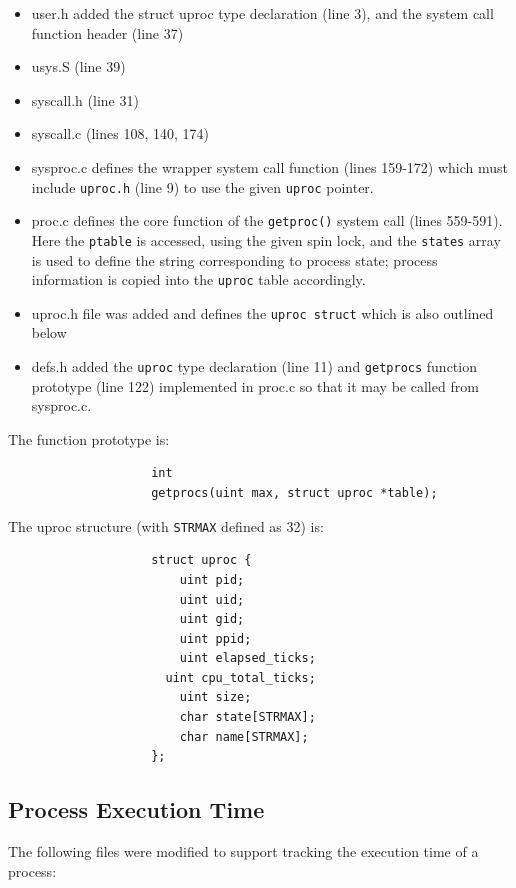\documentclass[11pt,letterpaper]{report}
\begin{document}
\begin{itemize}
					 \begin{itemize}
					
					\item user.h added the struct uproc type declaration (line 3), and the system call function header (line 37)
					\item usys.S (line 39)
					\item syscall.h (line 31)
					\item syscall.c (lines 108, 140, 174)
					\item sysproc.c  defines the wrapper system call function (lines 159-172) which must include {\tt uproc.h}
						(line 9) to use the given {\tt  uproc} pointer.
					\item proc.c defines the core function of the {\tt getproc()} system call (lines 559-591). Here the {\tt ptable} is accessed, using
						the given spin lock, and the {\tt states} array is used to define the string corresponding to process state; 
						 process information is copied into the {\tt uproc} table accordingly. 
					\item uproc.h file was added and defines the {\tt uproc struct} which is also outlined below
					\item defs.h added the {\tt uproc} type declaration (line 11) and {\tt getprocs} function prototype (line 122)  implemented in proc.c 
						so that it may be called from sysproc.c.
					
					\end{itemize}

					The function prototype is:
			       		 \begin{verbatim}
					int
					getprocs(uint max, struct uproc *table);
					\end{verbatim}
					
					The uproc structure (with {\tt STRMAX} defined as 32) is:
					\begin{verbatim}
					struct uproc {
					    uint pid;
					    uint uid;
					    uint gid;
					    uint ppid;
					    uint elapsed_ticks;
 					  uint cpu_total_ticks;
					    uint size;
					    char state[STRMAX];
					    char name[STRMAX];
					};
					\end{verbatim}
					
		\end{itemize} 
	
	\subsection*{Process Execution Time}
	The following files were modified to support tracking the execution time of a process:
	
\end{document}
